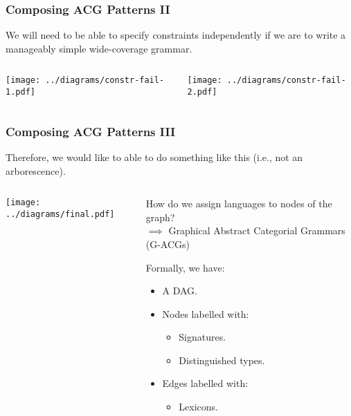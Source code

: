 \documentclass{beamer}
\begin{document}
\begin{frame}
  \frametitle{Composing ACG Patterns II}

  We will need to be able to specify constraints independently if we are
  to write a manageably simple wide-coverage grammar.

  \begin{columns}[c]
    \begin{column}{0.5\textwidth}
      \begin{center}
        \texttt{[image: ../diagrams/constr-fail-1.pdf]}
      \end{center}
    \end{column}
    \begin{column}{0.5\textwidth}
      \begin{center}
        \texttt{[image: ../diagrams/constr-fail-2.pdf]}
      \end{center}
    \end{column}
  \end{columns}
\end{frame}


\begin{frame}
  \frametitle{Composing ACG Patterns III}

  Therefore, we would like to able to do something like this (i.e., not
  an arborescence).

  \begin{columns}[c]
    \begin{column}{0.6\textwidth}
      \begin{center}
        \texttt{[image: ../diagrams/final.pdf]}
      \end{center}
    \end{column}
    \begin{column}{0.4\textwidth}
      How do we assign languages to nodes of the graph? \\
      $\implies$ Graphical Abstract Categorial Grammars (G-ACGs)

      \vspace{5 mm}

      Formally, we have:
        \begin{itemize}
        \item A DAG.
        \item Nodes labelled with:
          \begin{itemize}
          \item Signatures.
          \item Distinguished types.
          \end{itemize}
        \item Edges labelled with:
          \begin{itemize}
          \item Lexicons.
          \end{itemize}
        \end{itemize}
    \end{column}
  \end{columns}
\end{frame}
\end{document}
